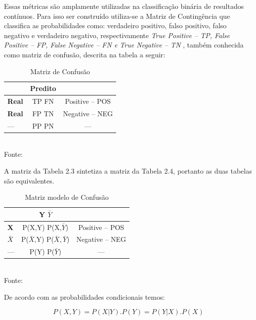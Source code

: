 Essas métricas são amplamente utilizadas na classificação binária de resultados contínuos. Para isso ser construído utiliza-se a Matriz de Contingência que classifica as probabilidades como:
verdadeiro positivo, falso positivo, falso negativo e verdadeiro negativo, respectivamente \textit{True Positive -- TP, False Positive -- FP, False Negative -- FN e True Negative -- TN },
também conhecida como matriz de confusão, descrita na tabela a seguir:

\begin{table}[ht]
\centering
\caption{Matriz de Confusão}
\vspace{1mm}
\begin{tabular}{l|c|c}
\hline
\textbf{} & \textbf{Predito} & \textbf{}\\
\hline
\textbf{Real}  & TP   FN & Positive -- POS\\
\textbf{Real}  & FP   TN & Negative -- NEG\\
\hline
   ---         & PP   PN &    ---         \\
\end{tabular}
\\
\tiny Fonte: \cite{Bradley1997}
\end{table}

A matriz da Tabela 2.3 sintetiza a matriz da Tabela 2.4, portanto as duas tabelas são equivalentes.

\begin{table}[ht]
\centering
\caption{Matriz modelo de Confusão}
\vspace{1mm}
\begin{tabular}{l|c|c}
\hline
\textbf{}           & \textbf{Y}     \textbf{$\bar{Y}$}   & \textbf{}\\
\hline
\textbf{X}          & P(X,Y)         P(X,$\bar{Y}$)       & Positive -- POS\\
\textbf{$\bar{X}$}  & P($\bar{X}$,Y) P($\bar{X},\bar{Y}$) & Negative -- NEG\\
\hline
   ---              & P(Y)           P($\bar{Y}$)         &     ---        \\
\end{tabular}
\\
\tiny Fonte: \cite{Bradley1997}
\end{table}


De acordo com as probabilidades condicionais temos:

\begin{equation}
 P(X,Y) = P(X|Y).P(Y) = P(Y|X).P(X)
\end{equation}

